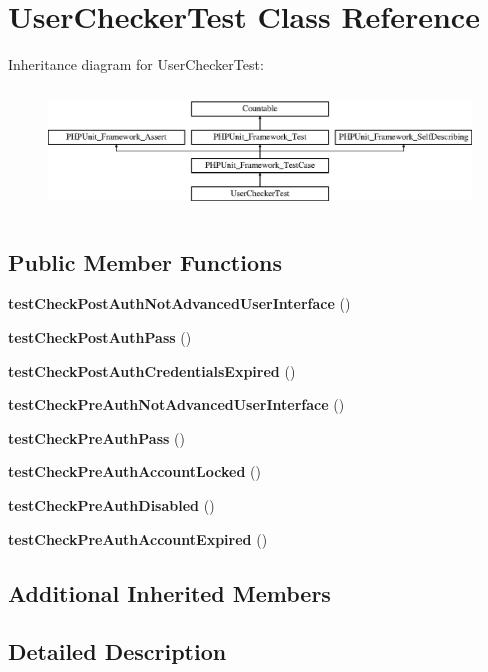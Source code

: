 \section{User\+Checker\+Test Class Reference}
\label{class_symfony_1_1_component_1_1_security_1_1_core_1_1_tests_1_1_user_1_1_user_checker_test}
Inheritance diagram for User\+Checker\+Test\+:\begin{figure}[H]
\begin{center}
\leavevmode
\includegraphics[height=3.303835cm]{class_symfony_1_1_component_1_1_security_1_1_core_1_1_tests_1_1_user_1_1_user_checker_test}
\end{center}
\end{figure}
\subsection*{Public Member Functions}
\begin{DoxyCompactItemize}
\item 
{\bf test\+Check\+Post\+Auth\+Not\+Advanced\+User\+Interface} ()
\item 
{\bf test\+Check\+Post\+Auth\+Pass} ()
\item 
{\bf test\+Check\+Post\+Auth\+Credentials\+Expired} ()
\item 
{\bf test\+Check\+Pre\+Auth\+Not\+Advanced\+User\+Interface} ()
\item 
{\bf test\+Check\+Pre\+Auth\+Pass} ()
\item 
{\bf test\+Check\+Pre\+Auth\+Account\+Locked} ()
\item 
{\bf test\+Check\+Pre\+Auth\+Disabled} ()
\item 
{\bf test\+Check\+Pre\+Auth\+Account\+Expired} ()
\end{DoxyCompactItemize}
\subsection*{Additional Inherited Members}


\subsection{Detailed Description}


